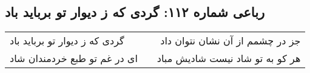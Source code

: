 \begin{center}
\section*{رباعی شماره ۱۱۲: گردی که ز دیوار تو برباید باد}
\label{sec:sh112}
\begin{longtable}{l p{0.5cm} r}
گردی که ز دیوار تو برباید باد
&&
جز در چشمم از آن نشان نتوان داد
\\
ای در غم تو طبع خردمندان شاد
&&
هر کو به تو شاد نیست شادیش مباد
\\
\end{longtable}
\end{center}
